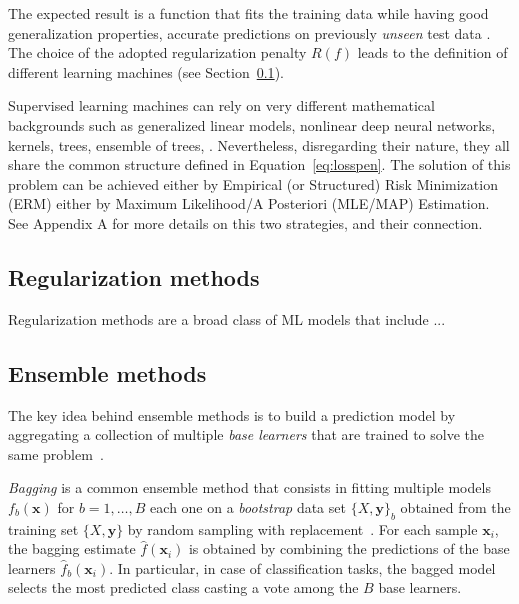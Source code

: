     The expected result is a function that fits the training data while having good generalization properties, \ie accurate predictions on previously  \textit{unseen} test data \cite{hastie2009elements}. The choice of the adopted regularization penalty $R(f)$ leads to the definition of different learning machines (see Section~\ref{subsec:regularization_methods}).
        
       

    Supervised learning machines can rely on very different mathematical backgrounds such as generalized linear models, nonlinear deep neural networks, kernels, trees, ensemble of trees, \etc. Nevertheless, disregarding their nature, they all share the common structure defined in Equation~\eqref{eq:losspen}.
    The solution of this problem can be achieved either by Empirical (or Structured) Risk Minimization (\ac{ERM}) either by Maximum Likelihood/A Posteriori (\ac{MLE}/\ac{MAP}) Estimation. See Appendix A for more details on this two strategies, and their connection.      

    \subsection{Regularization methods} \label{subsec:regularization_methods}
    Regularization methods are a broad class of ML models that include ...

    \subsection{Ensemble methods}

    The key idea behind ensemble methods is to build a prediction model by aggregating a collection of multiple \textit{base learners} that are trained to solve the same problem~\citep{zhou2012ensemble}.

    \textit{Bagging} is a common ensemble method that consists in fitting multiple models $f_b(\bm{x})$ for $b=1,\dots,B$ each one on a \textit{bootstrap} data set $\{X,\bm{y}\}_b$ obtained from the training set $\{X,\bm{y}\}$ by random sampling with replacement~\citep{hastie2009elements}. For each sample $\bm{x}_i$, the bagging estimate $\hat{f}(\bm{x}_i)$ is obtained by combining the predictions of the base learners $\hat{f}_b(\bm{x}_i)$. In particular, in case of classification tasks, the bagged model selects the most predicted class casting a vote among the $B$ base learners.

